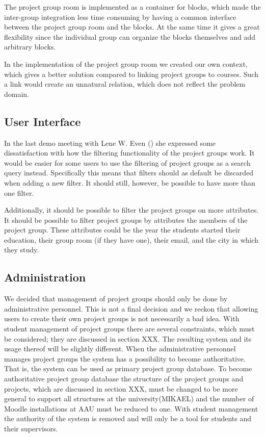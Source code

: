 The project group room is implemented as a container for blocks, which made the inter-group integration less time consuming by having a common interface between the project group room and the blocks.
At the same time it gives a great flexibility since the individual group can organize the blocks themselves and add arbitrary blocks.

In the implementation of the project group room we created our own context, which gives a better solution compared to linking project groups to courses. 
Such a link would create an unnatural relation, which does not reflect the problem domain.  

\subsection{User Interface}
In the last demo meeting with Lene W. Even () she expressed some dissatisfaction with how the filtering functionality of the project groups work.
It would be easier for some users to use the filtering of project groups as a search query instead.
Specifically this means that filters should as default be discarded when adding a new filter.
It should still, however, be possible to have more than one filter.

Additionally, it should be possible to filter the project groups on more attributes.
It should be possible to filter project groups by attributes the members of the project group.
These attributes could be the year the students started their education, their group room (if they have one), their email, and the city in which they study.


\subsection{Administration}
\label{sec:evalAdministration}
We decided that management of project groups should only be done by administrative personnel. 
This is not a final decision and we reckon that allowing users to create their own project groups is not necessarily a bad idea. 
With student management of project groups there are several constraints, which must be considered; they are discussed in section XXX. 
The resulting system and its usage thereof will be slightly different.
When the administrative personnel manages project groups the system has a possibility to become authoritative.
That is, the system can be used as primary project group database. 
To become authoritative project group database the structure of the project groups and projects, which are discussed in section XXX, must be changed to be more general to support all structures at the university(MIKAEL) and the number of Moodle installations at AAU must be reduced to one. 
With student management the authority of the system is removed and will only be a tool for students and their supervisors.

